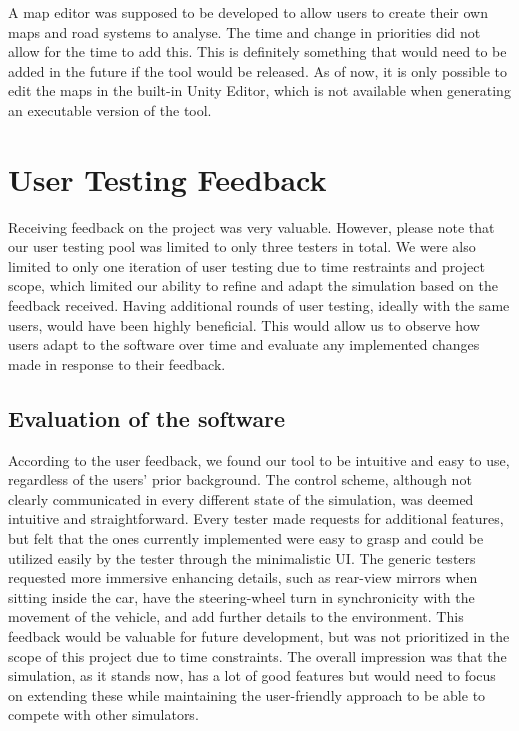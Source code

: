     A map editor was supposed to be developed to allow users to create their own maps and road systems to analyse. The time and change in priorities did not allow for the time to add this. This is definitely something that would need to be added in the future if the tool would be released. As of now, it is only possible to edit the maps in the built-in Unity Editor, which is not available when generating an executable version of the tool.

\section{User Testing Feedback}
    Receiving feedback on the project was very valuable. However, please note that our user testing pool was limited to only three testers in total. We were also limited to only one iteration of user testing due to time restraints and project scope, which limited our ability to refine and adapt the simulation based on the feedback received. Having additional rounds of user testing, ideally with the same users, would have been highly beneficial. This would allow us to observe how users adapt to the software over time and evaluate any implemented changes made in response to their feedback.
    
    \subsection{Evaluation of the software}
    According to the user feedback, we found our tool to be intuitive and easy to use, regardless of the users' prior background. The control scheme, although not clearly communicated in every different state of the simulation, was deemed intuitive and straightforward.  Every tester made requests for additional features, but felt that the ones currently implemented were easy to grasp and could be utilized easily by the tester through the minimalistic UI. The generic testers requested more immersive enhancing details, such as rear-view mirrors when sitting inside the car, have the steering-wheel turn in synchronicity with the movement of the vehicle, and add further details to the environment. This feedback would be valuable for future development, but was not prioritized in the scope of this project due to time constraints. The overall impression was that the simulation, as it stands now, has a lot of good features but would need to focus on extending these while maintaining the user-friendly approach to be able to compete with other simulators. 
    
